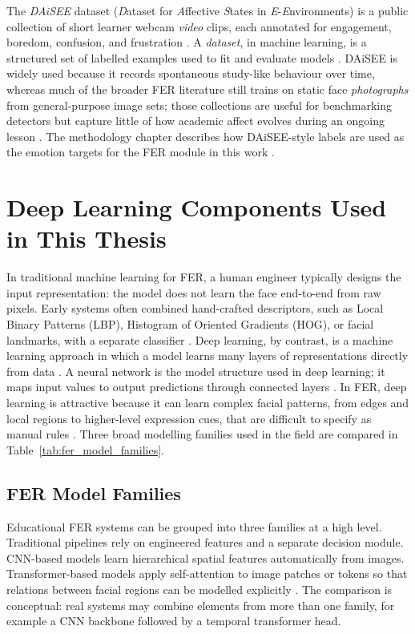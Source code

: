 The \emph{DAiSEE} dataset (\emph{D}ataset for \emph{A}ffective \emph{S}tates in \emph{E}-\emph{E}nvironments) is a public collection of short learner webcam \emph{video} clips, each annotated for engagement, boredom, confusion, and frustration \cite{gupta_daisee_2016}. A \emph{dataset}, in machine learning, is a structured set of labelled examples used to fit and evaluate models \cite{lek_academic_2023}. DAiSEE is widely used because it records spontaneous study-like behaviour over time, whereas much of the broader FER literature still trains on static face \emph{photographs} from general-purpose image sets; those collections are useful for benchmarking detectors but capture little of how academic affect evolves during an ongoing lesson \cite{lek_academic_2023,florestiyanto_emotion_2024}. The methodology chapter describes how DAiSEE-style labels are used as the emotion targets for the FER module in this work \cite{gupta_daisee_2016}.

\section{Deep Learning Components Used in This Thesis}

In traditional machine learning for FER, a human engineer typically designs the input representation: the model does not learn the face end-to-end from raw pixels. Early systems often combined hand-crafted descriptors, such as Local Binary Patterns (LBP), Histogram of Oriented Gradients (HOG), or facial landmarks, with a separate classifier \cite{lek_academic_2023,rao_recognition_2021}. Deep learning, by contrast, is a machine learning approach in which a model learns many layers of representations directly from data \cite{aly_revolutionizing_2025}. A neural network is the model structure used in deep learning; it maps input values to output predictions through connected layers \cite{gupta_edfa_2023}. In FER, deep learning is attractive because it can learn complex facial patterns, from edges and local regions to higher-level expression cues, that are difficult to specify as manual rules \cite{lek_academic_2023}. Three broad modelling families used in the field are compared in Table~\ref{tab:fer_model_families}.

\subsection{FER Model Families}\label{sec:bg:fer_families}

Educational FER systems can be grouped into three families at a high level. Traditional pipelines rely on engineered features and a separate decision module. CNN-based models learn hierarchical spatial features automatically from images. Transformer-based models apply self-attention to image patches or tokens so that relations between facial regions can be modelled explicitly \cite{lek_academic_2023,su_leveraging_2024,liu_dynamic_nodate,aly_revolutionizing_2025}. The comparison is conceptual: real systems may combine elements from more than one family, for example a CNN backbone followed by a temporal transformer head.

